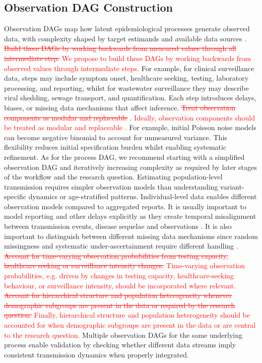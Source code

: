 \documentclass{article}
\begin{document}
\subsection{Observation DAG Construction} \label{sec:observation}

Observation DAGs map how latent epidemiological processes generate observed data, with complexity shaped by target estimands and available data sources \citep{deangelis2018analysing}.
\textcolor{red}{\st{Build these DAGs by working backwards from measured values through all intermediate step.}}
\textcolor{red}{We propose to build these DAGs by working backwards from observed values through intermediate steps.}
For example, for clinical surveillance data, steps may include symptom onset, healthcare seeking, testing, laboratory processing, and reporting, whilst for wastewater surveillance they may describe viral shedding, sewage transport, and quantification.
Each step introduces delays, biases, or missing data mechanisms that affect inference.
\textcolor{red}{\st{Treat observation components as modular and replaceable }}\citep{gelman2020bayesian}. 
\textcolor{red}{Ideally, observation components should be treated as modular and replaceable \citep{gelman2020bayesian}.}
For example, initial Poisson noise models can become negative binomial to account for unmeasured variance.
This flexibility reduces initial specification burden whilst enabling systematic refinement.
As for the process DAG, we recommend starting with a simplified observation DAG and iteratively increasing complexity as required by later stages of the workflow and the research question.
Estimating population-level transmission requires simpler observation models than understanding variant-specific dynamics or age-stratified patterns.
Individual-level data enables different observation models compared to aggregated reports.
It is usually important to model reporting and other delays explicitly as they create temporal misalignment between transmission events, disease sequelae and observations \citep{seaman2022nowcasting}.
It is also important to distinguish between different missing data mechanisms since random missingness and systematic under-ascertainment require different handling \citep{sherratt2021exploring}.
\textcolor{red}{\st{Account for time-varying observation probabilities from testing capacity, healthcare seeking or surveillance intensity changes.}}
\textcolor{red}{Time-varying observation probabilities, e.g. driven by changes in testing capacity, healthcare-seeking behaviour, or surveillance intensity, should be incorporated where relevant.}
\textcolor{red}{\st{Account for hierarchical structure and population heterogeneity whenever demographic subgroups are present in the data or required by the research question.}}
\textcolor{red}{Finally, hierarchical structure and population heterogeneity should be accounted for when demographic subgroups are present in the data or are central to the research question.}
Multiple observation DAGs for the same underlying process enable validation by checking whether different data streams imply consistent transmission dynamics when properly integrated.
\end{document}
